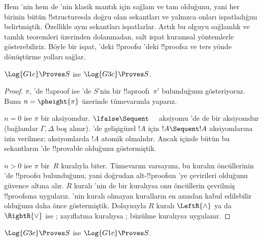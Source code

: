 



Hem 'nin hem de 'nin klasik mantık için sağlam ve tam
olduğunu, yani her birinin bütün !!{structure}s{}da doğru olan sekantları ve
yalnızca onları ispatladığını belirtmiştik. Özellikle aynı sekantları
ispatlarlar. Artık bu olguyu sağlamlık ve tamlık teoremleri üzerinden
dolanmadan, salt ispat kuramsal yöntemlerle gösterebiliriz. Böyle bir ispat,
'deki !!{proof}s{}ı 'deki !!{proof}s{}a ve ters yönde
dönüştürme yolları sağlar.

\begin{prop}
$\Log{G1c} \Proves S$ ise $\Log{G3c} \Proves S$.
\end{prop}

\begin{proof}
  $\pi$, 'de !!a{proof} ise 'de $S$'nin bir
  !!a{proof}{}ı~$\pi'$ bulunduğunu gösteriyoruz. Bunu $n = \pheight{\pi}$
  üzerinde tümevarımla yaparız.

  $n = 0$ ise $\pi$ bir aksiyomdur. $\lfalse \Sequent \quad$ aksiyomu
  'de de bir aksiyomdur (bağlamlar $\Gamma, \Delta$ boş alınır).
  'de gelişigüzel $!A$ için $!A \Sequent !A$ aksiyomlarına izin
  verilmez; aksiyomlarda $!A$ atomik olmalıdır. Ancak 
  içinde bütün bu sekantların 'de !!{provable} olduğunu
  göstermiştik.
  
  $n>0$ ise $\pi$ bir~$R$ kuralıyla biter. Tümevarım varsayımı, bu kuralın
  öncüllerinin 'de !!{proof}s{}ı bulunduğunu, yani doğrudan
  alt-!!{proof}s{}ın 'ye çevirileri olduğunu güvence altına alır.
  $R$ kuralı 'nin de bir kuralıysa onu öncüllerin çevrilmiş
  !!{proof}s{}ına uygularız. 'nin kuralı olmayan kuralların en azından
  kabul edilebilir olduğunu daha önce göstermiştik. Dolayısıyla $R$ kuralı
  $\LeftR{\land}$ ya da $\RightR{\lor}$ ise
  ; zayıflatma kuralıysa
  ; büzülme kuralıysa
   uygulanır.
\end{proof}

\begin{prop}
$\Log{G3c} \Proves S$ ise $\Log{G1c} \Proves S$.
\end{prop}

